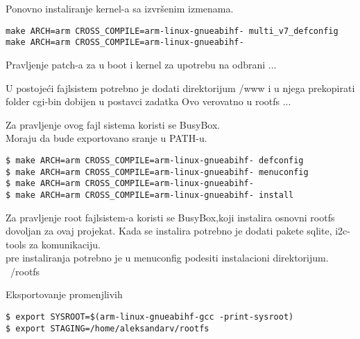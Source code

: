 \documentclass{article}
\begin{document}
Ponovno instaliranje kernel-a sa izvršenim izmenama. 

\begin{commandline}
  \begin{verbatim}
make ARCH=arm CROSS_COMPILE=arm-linux-gnueabihf- multi_v7_defconfig
make ARCH=arm CROSS_COMPILE=arm-linux-gnueabihf-
  \end{verbatim}
\end{commandline}



Pravljenje patch-a za u boot i kernel za upotrebu na odbrani ...





U postojeći fajlsistem potrebno je dodati direktorijum /www i u njega prekopirati folder cgi-bin dobijen u postavci zadatka 
Ovo verovatno u rootfs ...

Za pravljenje ovog fajl sistema koristi se BusyBox. \\

Moraju da bude exportovano sranje u PATH-u.

\begin{commandline}
  \begin{verbatim}
$ make ARCH=arm CROSS_COMPILE=arm-linux-gnueabihf- defconfig
$ make ARCH=arm CROSS_COMPILE=arm-linux-gnueabihf- menuconfig
$ make ARCH=arm CROSS_COMPILE=arm-linux-gnueabihf- 
$ make ARCH=arm CROSS_COMPILE=arm-linux-gnueabihf- install
  \end{verbatim}
\end{commandline}

Za pravljenje root fajlsistem-a koristi se BusyBox,koji instalira osnovni rootfs dovoljan za ovaj projekat. Kada se instalira potrebno je dodati pakete sqlite, i2c-tools za komunikaciju. \\

pre instaliranja potrebno je u menuconfig podesiti instalacioni direktorijum. ~/rootfs
 

Eksportovanje promenjlivih

\begin{commandline}
  \begin{verbatim}
$ export SYSROOT=$(arm-linux-gnueabihf-gcc -print-sysroot)
$ export STAGING=/home/aleksandarv/rootfs
  \end{verbatim}
\end{commandline}
\end{document}

